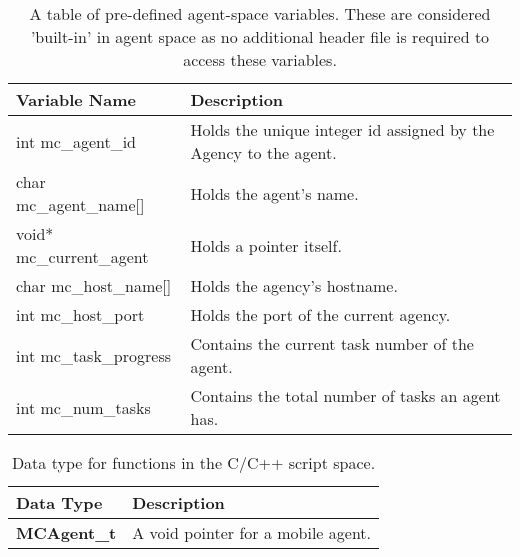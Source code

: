 \begin{table}[p]
\capstart
\begin{center}
\caption{A table of pre-defined agent-space variables. These are considered 'built-in'
in agent space as no additional header file is required to access these variables.}
\begin{tabular}{ll}
\hline
Variable Name& Description \\
\hline
int mc\_agent\_id \index{mc\_agent\_id}& Holds the unique integer id assigned by the Agency to the agent.\\
char mc\_agent\_name[] \index{mc\_agent\_name} & Holds the agent's name. \\
void* mc\_current\_agent \index{mc\_current\_agent}& Holds a pointer itself. \\
char mc\_host\_name[] \index{mc\_host\_name} & Holds the agency's hostname. \\
int mc\_host\_port \index{mc\_host\_port} & Holds the port of the current agency. \\
int mc\_task\_progress \index{mc\_task\_progress} & Contains the current task number of the agent. \\
int mc\_num\_tasks \index{mc\_num\_tasks} & Contains the total number of tasks an agent has. \\
\hline
\end{tabular}
\end{center}
\label{tab:agent_space_variables}
\end{table}

\begin{table}[p]
\capstart
\begin{center}
\caption{Data type for functions in the C/C++ script space.}
\begin{tabular}{p{50 mm}p{110 mm}}
\hline
Data Type & Description \\
\hline
{\bf MCAgent\_t} \index{MCAgent\_t} & A void pointer for a mobile agent. \\
\hline
\end{tabular}
\end{center}
\label{chmobilec_datatype}
\end{table}
\pagebreak

